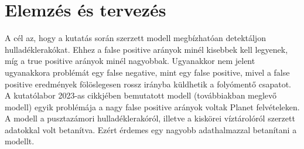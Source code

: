 \chapter{Elemzés és tervezés}
\label{ch:spec}

A cél az, hogy a kutatás során szerzett modell megbízhatóan detektáljon hulladéklerakókat. Ehhez a false positive arányok minél kisebbek kell legyenek, míg a true positive arányok minél nagyobbak. Ugyanakkor nem jelent ugyanakkora problémát egy false negative, mint egy false positive, mivel a false positive eredmények fölöslegesen rossz irányba küldhetik a folyómentő csapatot. 
A kutatólabor 2023-as cikkjében bemutatott modell (továbbiakban meglevő modell) egyik problémája a nagy false positive arányok voltak Planet felvételeken. A modell a pusztazámori hulladéklerakóról, illetve a kiskörei víztárolóról szerzett adatokkal volt betanítva. Ezért érdemes egy nagyobb adathalmazzal betanítani a modellt.

